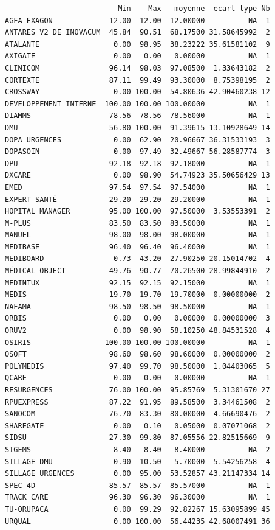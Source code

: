 \documentclass[]{article}
\begin{document}
\begin{verbatim}
                          Min    Max   moyenne  ecart-type Nb
AGFA EXAGON             12.00  12.00  12.00000          NA  1
ANTARES V2 DE INOVACUM  45.84  90.51  68.17500 31.58645992  2
ATALANTE                 0.00  98.95  38.23222 35.61581102  9
AXIGATE                  0.00   0.00   0.00000          NA  1
CLINICOM                96.14  98.03  97.08500  1.33643182  2
CORTEXTE                87.11  99.49  93.30000  8.75398195  2
CROSSWAY                 0.00 100.00  54.80636 42.90460238 12
DEVELOPPEMENT INTERNE  100.00 100.00 100.00000          NA  1
DIAMMS                  78.56  78.56  78.56000          NA  1
DMU                     56.80 100.00  91.39615 13.10928649 14
DOPA URGENCES            0.00  62.90  20.96667 36.31533193  3
DOPASOIN                 0.00  97.49  32.49667 56.28587774  3
DPU                     92.18  92.18  92.18000          NA  1
DXCARE                   0.00  98.90  54.74923 35.50656429 13
EMED                    97.54  97.54  97.54000          NA  1
EXPERT SANTÉ            29.20  29.20  29.20000          NA  1
HOPITAL MANAGER         95.00 100.00  97.50000  3.53553391  2
M-PLUS                  83.50  83.50  83.50000          NA  1
MANUEL                  98.00  98.00  98.00000          NA  1
MEDIBASE                96.40  96.40  96.40000          NA  1
MEDIBOARD                0.73  43.20  27.90250 20.15014702  4
MÉDICAL OBJECT          49.76  90.77  70.26500 28.99844910  2
MEDINTUX                92.15  92.15  92.15000          NA  1
MEDIS                   19.70  19.70  19.70000  0.00000000  2
NAFAMA                  98.50  98.50  98.50000          NA  1
ORBIS                    0.00   0.00   0.00000  0.00000000  3
ORUV2                    0.00  98.90  58.10250 48.84531528  4
OSIRIS                 100.00 100.00 100.00000          NA  1
OSOFT                   98.60  98.60  98.60000  0.00000000  2
POLYMEDIS               97.40  99.70  98.50000  1.04403065  5
QCARE                    0.00   0.00   0.00000          NA  1
RESURGENCES             76.00 100.00  95.85769  5.31301670 27
RPUEXPRESS              87.22  91.95  89.58500  3.34461508  2
SANOCOM                 76.70  83.30  80.00000  4.66690476  2
SHAREGATE                0.00   0.10   0.05000  0.07071068  2
SIDSU                   27.30  99.80  87.05556 22.82515669  9
SIGEMS                   8.40   8.40   8.40000          NA  2
SILLAGE DMU              0.90  10.50   5.70000  5.54256258  4
SILLAGE URGENCES         0.00  95.00  53.52857 43.21147334 14
SPEC 4D                 85.57  85.57  85.57000          NA  1
TRACK CARE              96.30  96.30  96.30000          NA  1
TU-ORUPACA               0.00  99.29  92.82267 15.63095899 45
URQUAL                   0.00 100.00  56.44235 42.68007491 36
\end{verbatim}
\end{document}
